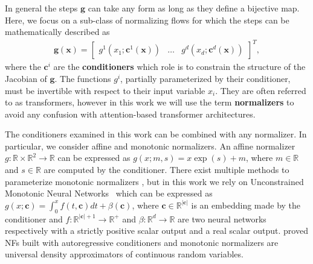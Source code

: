 In general the steps $\mathbf{g}$ can take any form as long as they define a bijective map. Here, we focus  on a sub-class of normalizing flows for which the steps can be mathematically described as
\begin{align}
    \mathbf{g}(\mathbf{x}) = \begin{bmatrix}
g^1(x_{1}; \mathbf{c}^1(\mathbf{x}))  & \hdots & g^d(x_{d}; \mathbf{c}^d(\mathbf{x}))
\end{bmatrix}^T,\label{eq:gnf}
\end{align}
where the $\mathbf{c}^i$ are the \textbf{conditioners} which role is to constrain the structure of the Jacobian of $\mathbf{g}$.
The functions $g^i$, partially parameterized by their conditioner, must be invertible with respect to their input variable $x_i$. They are often referred to as transformers, however in this work we will use the term \textbf{normalizers} to avoid any confusion with attention-based transformer architectures.


The conditioners examined in this work can be combined with any normalizer. In particular, we consider affine and monotonic normalizers. An affine normalizer $g: \mathbb{R} \times \mathbb{R}^2 \rightarrow \mathbb{R}$ can be expressed as
$g(x;m, s) = x\exp(s) + m$, where $m \in \mathbb{R}$ and $s \in \mathbb{R}$ are computed by the conditioner. There exist multiple methods to parameterize monotonic normalizers \citep{huang2018neural, de2020block, neural-spline-flows, sos}, but in this work we rely on Unconstrained Monotonic Neural Networks~\citep[UMNNs, ][]{UMNN} which can be expressed as
$g(x; \mathbf{c}) = \int^x_0 f(t, \mathbf{c}) dt + \beta(\mathbf{c})$, where $\mathbf{c} \in \mathbb{R}^{|\mathbf{c}|}$ is an embedding made by the conditioner and $f: \mathbb{R}^{|\mathbf{c}| + 1} \rightarrow \mathbb{R}^+$ and  $\beta: \mathbb{R}^d\rightarrow\mathbb{R}$ are two neural networks respectively with a strictly positive scalar output and a real scalar output. \cite{huang2018neural} proved NFs built with autoregressive conditioners and monotonic normalizers are universal density approximators of continuous random variables.



